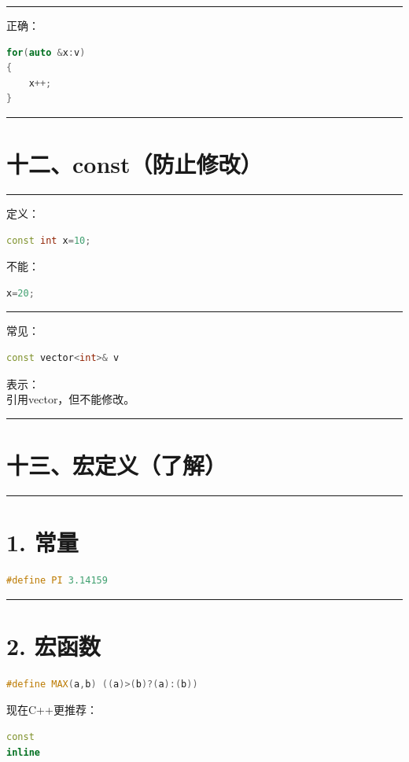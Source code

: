 \documentclass[9pt,twocolumn]{extarticle}
\begin{document}
\noindent\rule{\linewidth}{0.4pt}

正确：
\begin{lstlisting}[language=C++]
for(auto &x:v)
{
    x++;
}
\end{lstlisting}

\noindent\rule{\linewidth}{0.4pt}

\section{十二、const（防止修改）}

\noindent\rule{\linewidth}{0.4pt}

定义：
\begin{lstlisting}[language=C++]
const int x=10;
\end{lstlisting}
不能：
\begin{lstlisting}[language=C++]
x=20;
\end{lstlisting}

\noindent\rule{\linewidth}{0.4pt}

常见：
\begin{lstlisting}[language=C++]
const vector<int>& v
\end{lstlisting}
表示：\\
引用vector，但不能修改。

\noindent\rule{\linewidth}{0.4pt}

\section{十三、宏定义（了解）}

\noindent\rule{\linewidth}{0.4pt}

\section{1. 常量}
\begin{lstlisting}[language=C++]
#define PI 3.14159
\end{lstlisting}

\noindent\rule{\linewidth}{0.4pt}

\section{2. 宏函数}
\begin{lstlisting}[language=C++]
#define MAX(a,b) ((a)>(b)?(a):(b))
\end{lstlisting}
现在C++更推荐：
\begin{lstlisting}[language=C++]
const
inline
\end{lstlisting}
\end{document}
